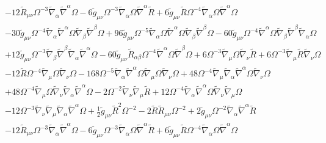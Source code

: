 \documentclass[10pt,letterpaper]{article}
\numberwithin{equation}{section}
\begin{document}
\begin{eqnarray}
&& - 12 \tilde R_{\mu \nu } \Omega^{-3} \tilde\nabla_{\alpha }\tilde\nabla^{\alpha }\Omega - 6 \tilde g_{\mu \nu } \Omega^{-3} \tilde\nabla_{\alpha }\Omega \tilde\nabla^{\alpha }\tilde R + 6 \tilde g_{\mu \nu } \tilde R \Omega^{-4} \tilde\nabla_{\alpha }\Omega \tilde\nabla^{\alpha }\Omega \nonumber \\ 
&& - 30 \tilde g_{\mu \nu } \Omega^{-4} \tilde\nabla_{\alpha }\tilde\nabla^{\alpha }\Omega \tilde\nabla_{\beta }\tilde\nabla^{\beta }\Omega + 96 \tilde g_{\mu \nu } \Omega^{-5} \tilde\nabla_{\alpha }\Omega \tilde\nabla^{\alpha }\Omega \tilde\nabla_{\beta }\tilde\nabla^{\beta }\Omega - 60 \tilde g_{\mu \nu } \Omega^{-4} \tilde\nabla^{\alpha }\Omega \tilde\nabla_{\beta }\tilde\nabla^{\beta }\tilde\nabla_{\alpha }\Omega \nonumber \\ 
&& + 12 \tilde g_{\mu \nu } \Omega^{-3} \tilde\nabla_{\beta }\tilde\nabla^{\beta }\tilde\nabla_{\alpha }\tilde\nabla^{\alpha }\Omega - 60 \tilde g_{\mu \nu } \tilde R_{\alpha \beta } \Omega^{-4} \tilde\nabla^{\alpha }\Omega \tilde\nabla^{\beta }\Omega + 6 \Omega^{-3} \tilde\nabla_{\mu }\Omega \tilde\nabla_{\nu }\tilde R + 6 \Omega^{-3} \tilde\nabla_{\mu }\tilde R \tilde\nabla_{\nu }\Omega \nonumber \\ 
&& - 12 \tilde R \Omega^{-4} \tilde\nabla_{\mu }\Omega \tilde\nabla_{\nu }\Omega - 168 \Omega^{-5} \tilde\nabla_{\alpha }\tilde\nabla^{\alpha }\Omega \tilde\nabla_{\mu }\Omega \tilde\nabla_{\nu }\Omega + 48 \Omega^{-4} \tilde\nabla_{\mu }\tilde\nabla_{\alpha }\tilde\nabla^{\alpha }\Omega \tilde\nabla_{\nu }\Omega \nonumber \\ 
&& + 48 \Omega^{-4} \tilde\nabla_{\mu }\Omega \tilde\nabla_{\nu }\tilde\nabla_{\alpha }\tilde\nabla^{\alpha }\Omega - 2 \Omega^{-2} \tilde\nabla_{\nu }\tilde\nabla_{\mu }\tilde R + 12 \Omega^{-4} \tilde\nabla_{\alpha }\tilde\nabla^{\alpha }\Omega \tilde\nabla_{\nu }\tilde\nabla_{\mu }\Omega \nonumber \\ 
&& - 12 \Omega^{-3} \tilde\nabla_{\nu }\tilde\nabla_{\mu }\tilde\nabla_{\alpha }\tilde\nabla^{\alpha }\Omega +\tfrac{1}{2} \tilde g_{\mu \nu } \tilde R^2 \Omega^{-2} - 2 \tilde R \tilde R_{\mu \nu } \Omega^{-2} + 2 \tilde g_{\mu \nu } \Omega^{-2} \tilde\nabla_{\alpha }\tilde\nabla^{\alpha }\tilde R \nonumber \\ 
&& - 12 \tilde R_{\mu \nu } \Omega^{-3} \tilde\nabla_{\alpha }\tilde\nabla^{\alpha }\Omega - 6 \tilde g_{\mu \nu } \Omega^{-3} \tilde\nabla_{\alpha }\Omega \tilde\nabla^{\alpha }\tilde R + 6 \tilde g_{\mu \nu } \tilde R \Omega^{-4} \tilde\nabla_{\alpha }\Omega \tilde\nabla^{\alpha }\Omega \nonumber \\ 

\end{eqnarray}
\end{document}
